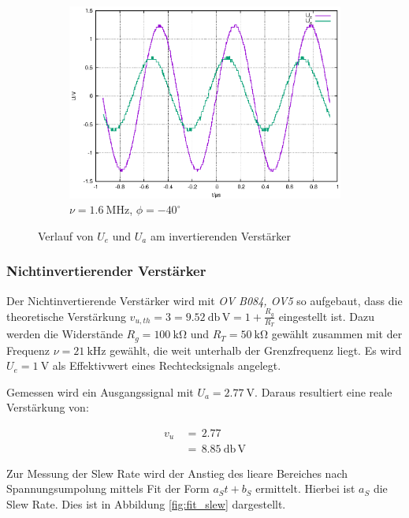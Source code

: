 \documentclass[10pt,a4paper]{scrartcl}
\begin{document}
\begin{figure}[!ht]
    \begin{subfigure}[t]{0.6\textwidth}
        \centering
        \includegraphics[width=\textwidth]{graphics/plot_invVers_o.eps}
        \caption{$\nu=1.6~\mathrm{MHz}$, $\phi=-40^\circ$}
    \end{subfigure}
    \caption{Verlauf von $U_e$ und $U_a$ am invertierenden Verstärker}
    \label{fig:InvVerst}
\end{figure}

\subsubsection {Nichtinvertierender Verstärker}

Der Nichtinvertierende Verstärker wird mit \emph{OV B084, OV5} so aufgebaut,
dass die theoretische Verstärkung
$v_{u,th}=3=9.52~\mathrm{db\,V}=1+\frac{R_g}{R_T}$
eingestellt ist.
Dazu werden die Widerstände $R_g=100~\mathrm{k\Omega}$ und
$R_T=50~\mathrm{k\Omega}$ gewählt zusammen mit der Frequenz
$\nu=21~\mathrm{kHz}$ gewählt,
die weit unterhalb der Grenzfrequenz liegt.
Es wird $U_e=1~\mathrm V$ als Effektivwert eines Rechtecksignals angelegt.

Gemessen wird ein Ausgangssignal mit $U_a=2.77~\mathrm V$.
Daraus resultiert eine reale Verstärkung von:

\begin{align*}
    v_u\,&=\,2.77\\
         &=\,8.85~\mathrm{db\,V}
\end{align*}

Zur Messung der Slew Rate wird der Anstieg des lieare Bereiches nach
Spannungsumpolung mittels Fit der Form $a_St+b_S$ ermittelt.
Hierbei ist $a_S$ die Slew Rate.
Dies ist in Abbildung \ref{fig:fit_slew} dargestellt.
\end{document}
